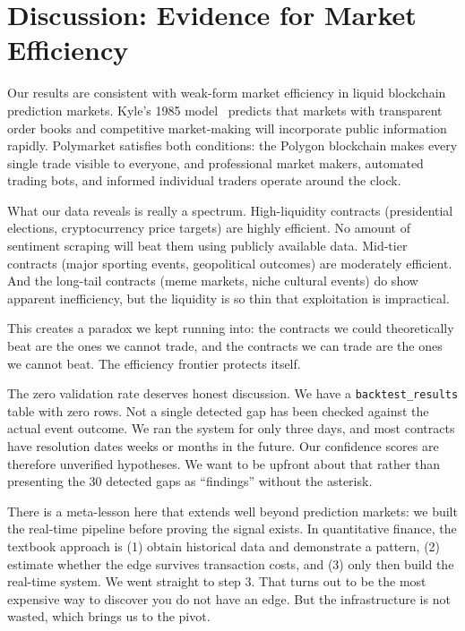 \documentclass[conference]{IEEEtran}
\begin{document}
\section{Discussion: Evidence for Market Efficiency}

Our results are consistent with weak-form market efficiency in liquid blockchain prediction markets. Kyle's 1985 model~\cite{kyle1985} predicts that markets with transparent order books and competitive market-making will incorporate public information rapidly. Polymarket satisfies both conditions: the Polygon blockchain makes every single trade visible to everyone, and professional market makers, automated trading bots, and informed individual traders operate around the clock.

What our data reveals is really a spectrum. High-liquidity contracts (presidential elections, cryptocurrency price targets) are highly efficient. No amount of sentiment scraping will beat them using publicly available data. Mid-tier contracts (major sporting events, geopolitical outcomes) are moderately efficient. And the long-tail contracts (meme markets, niche cultural events) do show apparent inefficiency, but the liquidity is so thin that exploitation is impractical.

This creates a paradox we kept running into: the contracts we could theoretically beat are the ones we cannot trade, and the contracts we can trade are the ones we cannot beat. The efficiency frontier protects itself.

The zero validation rate deserves honest discussion. We have a \texttt{backtest\_results} table with zero rows. Not a single detected gap has been checked against the actual event outcome. We ran the system for only three days, and most contracts have resolution dates weeks or months in the future. Our confidence scores are therefore unverified hypotheses. We want to be upfront about that rather than presenting the 30 detected gaps as ``findings'' without the asterisk.

There is a meta-lesson here that extends well beyond prediction markets: we built the real-time pipeline before proving the signal exists. In quantitative finance, the textbook approach is (1) obtain historical data and demonstrate a pattern, (2) estimate whether the edge survives transaction costs, and (3) only then build the real-time system. We went straight to step 3. That turns out to be the most expensive way to discover you do not have an edge. But the infrastructure is not wasted, which brings us to the pivot.
\end{document}
